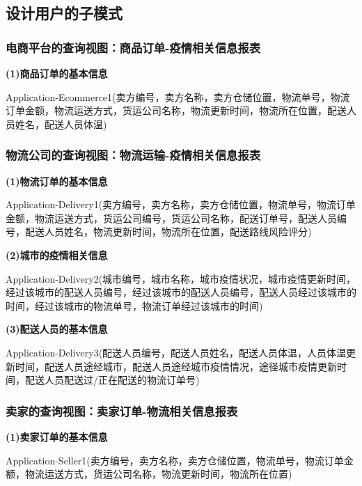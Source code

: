 \documentclass[12pt]{article}
\begin{document}
\subsection{设计用户的子模式}

\subsubsection{电商平台的查询视图：商品订单-疫情相关信息报表}

\noindent \textbf{(1)商品订单的基本信息} \par 
\noindent Application-Ecommerce1(卖方编号，卖方名称，卖方仓储位置，物流单号，物流订单金额，物流运送方式，货运公司名称，物流更新时间，物流所在位置，配送人员姓名，配送人员体温)

\subsubsection{物流公司的查询视图：物流运输-疫情相关信息报表}

\noindent \textbf{(1)物流订单的基本信息} \par 
\noindent Application-Delivery1(卖方编号，卖方名称，卖方仓储位置，物流单号，物流订单金额，物流运送方式，货运公司编号，货运公司名称，配送订单号，配送人员编号，配送人员姓名，物流更新时间，物流所在位置，配送路线风险评分)

\vspace{0.3cm}
\noindent \textbf{(2)城市的疫情相关信息} \par 
\noindent Application-Delivery2(城市编号，城市名称，城市疫情状况，城市疫情更新时间，经过该城市的配送人员编号，经过该城市的配送人员编号，配送人员经过该城市的时间，经过该城市的物流单号，物流订单经过该城市的时间)

\vspace{0.3cm}
\noindent \textbf{(3)配送人员的基本信息} \par 
\noindent Application-Delivery3(配送人员编号，配送人员姓名，配送人员体温，人员体温更新时间，配送人员途经城市，配送人员途经城市疫情情况，途径城市疫情更新时间，配送人员配送过/正在配送的物流订单号)

\subsubsection{卖家的查询视图：卖家订单-物流相关信息报表}

\noindent \textbf{(1)卖家订单的基本信息} \par 
\noindent Application-Seller1(卖方编号，卖方名称，卖方仓储位置，物流单号，物流订单金额，物流运送方式，货运公司名称，物流更新时间，物流所在位置)
\end{document}
